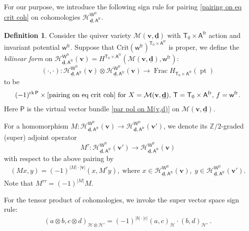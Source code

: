 \documentclass[10pt]{amsart}
\theoremstyle{definition}
\newtheorem{Definition}[Theorem]{Definition}
\numberwithin{equation}{section}
\newcommand{\Crit}{\mathrm{Crit}}
\newcommand{\bZ}{\mathbb{Z}}
\newcommand{\bv}{\mathbf{v}}
\newcommand{\bd}{\mathbf{d}}
\newcommand{\cH}{\mathcal{H}}
\newcommand{\cM}{\mathcal{M}}
\newcommand{\sA}{\mathsf{A}}
\newcommand{\sT}{\mathsf{T}}
\newcommand{\sW}{\mathsf{W}}
\newcommand{\sw}{\mathsf{w}}
\newcommand{\Frac}{\operatorname{Frac}}
\newcommand{\pt}{\operatorname{pt}}
\newcommand{\rk}{\operatorname{rk}}
\begin{document}
For our purpose, we introduce the following sign rule for pairing \eqref{pairing on eq crit coh} on cohomologies $\cH^{\sW^{\mathrm{fr}}}_{\underline{\bd},\sA^{\mathrm{fr}}}$.

\begin{Definition}
Consider the quiver variety $\cM(\bv,\underline{\bd})$ with $\sT_0\times \sA^{\mathrm{fr}}$ action and invariant potential $\sw^{\mathrm{fr}}$.
Suppose that $\Crit(\sw^{\mathrm{fr}})^{\sT_0\times \sA^{\mathrm{fr}}}$ is proper, we define the \textit{bilinear form} 
on $\cH^{\sW^{\mathrm{fr}}}_{\underline{\bd},\sA^{\mathrm{fr}}}(\bv)=H^{\sT_0\times \sA^{\mathrm{fr}}}(\cM(\bv,\underline{\bd}),\sw^{\mathrm{fr}})$: 
\begin{equation}\label{equ on bilinear form}(\cdot,\cdot)\colon \cH^{\sW^{\mathrm{fr}}}_{\underline{\bd},\sA^{\mathrm{fr}}}(\bv)\otimes \cH^{\sW^{\mathrm{fr}}}_{\underline{\bd},\sA^{\mathrm{fr}}}(\bv)\to  \Frac H_{\sT_0\times \sA^{\mathrm{fr}}}(\pt) \end{equation}
to be
\begin{align*}
    (-1)^{\rk \mathsf P}\times \eqref{pairing on eq crit coh}\text{ for $X=\cM(\bv,\underline{\bd})$, $\sT=\sT_0\times \sA^{\mathrm{fr}}$, $f=\sw^{\mathrm{fr}}$}.
\end{align*}
Here $\mathsf P$ is the virtual vector bundle \eqref{par pol on M(v,d)} on $\cM(\bv,\underline{\bd})$. 

For a homomorphism $M\colon \cH^{\sW^{\mathrm{fr}}}_{\underline{\bd},\sA^{\mathrm{fr}}}(\bv)\to \cH^{\sW^{\mathrm{fr}}}_{\underline{\bd},\sA^{\mathrm{fr}}}(\bv')$, we denote its $\bZ/2$-graded (super) adjoint operator  
\begin{equation}\label{equ on z2adj op}
M^{\tau}\colon \cH^{\sW^{\mathrm{fr}}}_{\underline{\bd},\sA^{\mathrm{fr}}}(\bv')\to \cH^{\sW^{\mathrm{fr}}}_{\underline{\bd},\sA^{\mathrm{fr}}}(\bv)
\end{equation}
with respect to the above pairing by 
\begin{align*}
    (Mx,y)=(-1)^{|M|\cdot|\bv|}(x,M^\tau y),\;\text{where }x\in\cH^{\sW^{\mathrm{fr}}}_{\underline{\bd},\sA^{\mathrm{fr}}}(\bv),\;y\in \cH^{\sW^{\mathrm{fr}}}_{\underline{\bd},\sA^{\mathrm{fr}}}(\bv').
\end{align*}
Note that $M^{\tau\tau}=(-1)^{|M|}M$.

For the tensor product of cohomologies, we invoke the super vector space sign rule:
\begin{align*}
    (a\otimes b,c\otimes d)_{\cH\otimes\cH'}=(-1)^{|b|\cdot|c|}(a,c)_{\cH}\cdot( b,d)_{\cH'}\:.
\end{align*}
\end{Definition}
\end{document}
